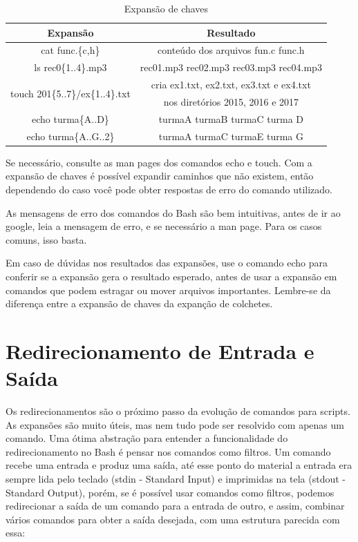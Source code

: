 \documentclass[oneside, 11 pt]{article}
\begin{document}
	\begin{table}[!ht]
		\centering
		\begin{tabular}{ | c | c | } 
			\hline
			\bfseries Expansão & \bfseries Resultado \\
			\hline
			cat func.\{c,h\} & conteúdo dos arquivos fun.c func.h \\
			\hline
			ls rec0\{1..4\}.mp3 & rec01.mp3 rec02.mp3 rec03.mp3 rec04.mp3 \\
			\hline
			\multirow{2}{13em}{touch 201\{5..7\}/ex\{1..4\}.txt} & cria ex1.txt, ex2.txt, ex3.txt e ex4.txt \\ 
			& nos diretórios 2015, 2016 e 2017 \\
			\hline
			echo turma\{A..D\} & turmaA turmaB turmaC turma D\\
			\hline
			echo turma\{A..G..2\} & turmaA turmaC turmaE turma G\\
			\hline
		\end{tabular}
		\caption{Expansão de chaves}
		\label{table:3}
	\end{table}
	Se necessário, consulte as man pages dos comandos echo e touch. Com a expansão de chaves é possível expandir caminhos que não existem, então dependendo do caso você pode obter respostas de erro do comando utilizado.
	
	As mensagens de erro dos comandos do Bash são bem intuitivas, antes de ir ao google, leia a mensagem de erro, e se necessário a man page. Para os casos comuns, isso basta.
	
	Em caso de dúvidas nos resultados das expansões, use o comando echo para conferir se a expansão gera o resultado esperado, antes de usar a expansão em comandos que podem estragar ou mover arquivos importantes. Lembre-se da diferença entre a expansão de chaves da expanção de colchetes.
	\section{Redirecionamento de Entrada e Saída}
	Os redirecionamentos são o próximo passo da evolução de comandos para scripts. As expansões são muito úteis, mas nem tudo pode ser resolvido com apenas um comando. Uma ótima abstração para entender a funcionalidade do redirecionamento no Bash é pensar nos comandos como filtros. Um comando recebe uma entrada e produz uma saída, até esse ponto do material a entrada era sempre lida pelo teclado (stdin - Standard Input) e imprimidas na tela (stdout - Standard Output), porém, se é possível usar comandos como filtros, podemos redirecionar a saída de um comando para a entrada de outro, e assim, combinar vários comandos para obter a saída desejada, com uma estrutura parecida com essa:
	
\end{document}
